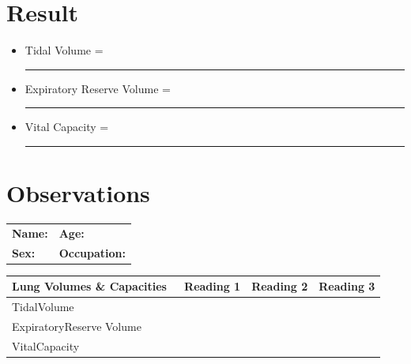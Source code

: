 \documentclass[a4paper,12pt,openany,oneside]{book}
\begin{document}
															\section*{Result}
														\begin{itemize}
														\item[]	Tidal Volume						=\rule{5cm}{.5pt}	
\item[]		Expiratory Reserve Volume				=\rule{5cm}{.5pt}
\item[]			Vital Capacity						=\rule{5cm}{.5pt}	
														\end{itemize}

														\section*{Observations}

															\begin{tabular}{p{3in} p{1in}}
																\textbf{Name:}  & \textbf{Age:}\\
																\textbf{Sex:}   & \textbf{Occupation:}
															\end{tabular}

\begin{table}[H]
\centering
\begin{tabular}{|l|l|l|l|} 
	\hline
	\textbf{Lung			Volumes \& Capacities}~							 &  \textbf{Reading			1} &  \textbf{Reading			2} &  \textbf{Reading			3}  \\ 
	\hline
	TidalVolume                                   &                       &                        &                        \\ 
	\hline
	ExpiratoryReserve Volume                      &                       &                        &                        \\ 
	\hline
	VitalCapacity                                 &                       &                        &                        \\
	\hline
\end{tabular}
\end{table}
\end{document}
